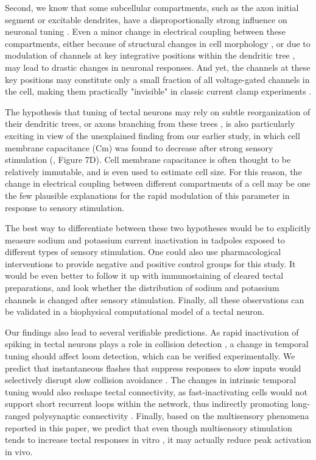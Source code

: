 \documentclass{article}
\begin{document}
Second, we know that some subcellular compartments, such as the axon initial segment or excitable dendrites, have a disproportionally strong influence on neuronal tuning \citep{jarvis2018morphology, moldwin2019perceptron}. Even a minor change in electrical coupling between these compartments, either because of structural changes in cell morphology \citep{grubb2010activity, kuba2010initial, leterrier2018axon}, or due to modulation of channels at key integrative positions within the dendritic tree \citep{murakoshi1997kv2phosphorilation}, may lead to drastic changes in neuronal responses. And yet, the  channels at these key positions may constitute only a small fraction of all voltage-gated channels in the cell, making them practically "invisible" in classic current clamp experiments \citep{kole2007, hamada2016}. 

The hypothesis that tuning of tectal neurons may rely on subtle reorganization of their dendritic trees, or axons branching from these trees \citep{lazar1973golgi}, is also particularly exciting in view of the unexplained finding from our earlier study, in which cell membrane capacitance (Cm) was found to decrease after strong sensory stimulation (\citealt{ciarleglio2015}, Figure 7D). Cell membrane capacitance is often thought to be relatively immutable, and is even used to estimate cell size. For this reason, the change in electrical coupling between different compartments of a cell may be one the few plausible explanations for the rapid modulation of this parameter in response to sensory stimulation.

The best way to differentiate between these two hypotheses would be to explicitly measure sodium and potassium current inactivation \citep{zbili2019axonnav} in tadpoles exposed to different types of sensory stimulation. One could also use pharmacological interventions to provide negative and positive control groups for this study. It would be even better to follow it up with immunostaining of cleared tectal preparations, and look whether the distribution of sodium and potassium channels is changed after sensory stimulation. Finally, all these observations can be validated in a biophysical computational model of a tectal neuron.

Our findings also lead to several verifiable predictions. As rapid inactivation of spiking in tectal neurons plays a role in collision detection \citep{khakhalin2014, jang2016}, a change in temporal tuning should affect loom detection, which can be verified experimentally. We predict that instantaneous flashes that suppress responses to slow inputs would selectively disrupt slow collision avoidance \citep{khakhalin2014}. The changes in intrinsic temporal tuning would also reshape tectal connectivity, as fast-inactivating cells would not support short recurrent loops within the network, thus indirectly promoting long-ranged polysynaptic connectivity \citep{fiete2010stdp, clopath2010stdp, khakhalin2019graph}. Finally, based on the multisensory phenomena reported in this paper, we predict that even though multisensory stimulation tends to increase tectal responses in vitro \citep{felch2016,truszkowski2017}, it may actually reduce peak activation in vivo.
\end{document}
